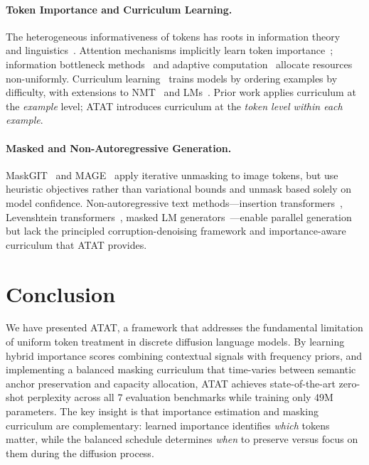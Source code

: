 \documentclass[11pt]{article}
\theoremstyle{remark}
\begin{document}
\paragraph{Token Importance and Curriculum Learning.} The heterogeneous informativeness of tokens has roots in information theory~\citep{shannon1948mathematical,shannon1951prediction} and linguistics~\citep{zipf1949human}. Attention mechanisms implicitly learn token importance~\citep{clark2019does,vig2019multiscale,tenney2019bert}; information bottleneck methods~\citep{tishby2000information} and adaptive computation~\citep{graves2016adaptive,dehghani2018universal} allocate resources non-uniformly. Curriculum learning~\citep{curriculum_learning} trains models by ordering examples by difficulty, with extensions to NMT~\citep{platanios2019competence} and LMs~\citep{campos2021curriculum}. Prior work applies curriculum at the \textit{example} level; ATAT introduces curriculum at the \textit{token level within each example}.

\paragraph{Masked and Non-Autoregressive Generation.} MaskGIT~\citep{chang2022maskgit} and MAGE~\citep{li2023mage} apply iterative unmasking to image tokens, but use heuristic objectives rather than variational bounds and unmask based solely on model confidence. Non-autoregressive text methods---insertion transformers~\citep{stern2019insertion}, Levenshtein transformers~\citep{gu2019levenshtein}, masked LM generators~\citep{wang2019bert}---enable parallel generation but lack the principled corruption-denoising framework and importance-aware curriculum that ATAT provides.

\section{Conclusion}
\label{sec:conclusion}

We have presented ATAT, a framework that addresses the fundamental limitation of uniform token treatment in discrete diffusion language models. By learning hybrid importance scores combining contextual signals with frequency priors, and implementing a balanced masking curriculum that time-varies between semantic anchor preservation and capacity allocation, ATAT achieves state-of-the-art zero-shot perplexity across all 7 evaluation benchmarks while training only 49M parameters. The key insight is that importance estimation and masking curriculum are complementary: learned importance identifies \textit{which} tokens matter, while the balanced schedule determines \textit{when} to preserve versus focus on them during the diffusion process. 
\end{document}
